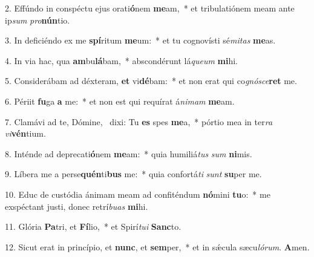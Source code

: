 2. Effúndo in conspéctu ejus orati\textbf{ó}nem \textbf{me}am,~* et tribulatiónem meam ante ip\textit{sum} \textit{pro}\textbf{nún}tio.

3. In deficiéndo ex me \textbf{spí}ritum \textbf{me}um:~* et tu cognovísti sé\textit{mi}\textit{tas} \textbf{me}as.

4. In via hac, qua \textbf{am}bu\textbf{lá}bam,~* abscondérunt lá\textit{que}\textit{um} \textbf{mi}hi.

5. Considerábam ad déxteram, \textbf{et} vi\textbf{dé}bam:~* et non erat qui co\textit{gnó}\textit{sce}\textbf{ret} me.

6. Périit \textbf{fu}ga \textbf{a} me:~* et non est qui requírat á\textit{ni}\textit{mam} \textbf{me}am.

7. Clamávi ad te, Dómine,~{\color{red}\GreDagger} dixi: Tu \textbf{es} spes \textbf{me}a,~* pórtio mea in ter\textit{ra} \textit{vi}\textbf{vén}tium.

8. Inténde ad deprecati\textbf{ó}nem \textbf{me}am:~* quia humiliá\textit{tus} \textit{sum} \textbf{ni}mis.

9. Líbera me a perse\textbf{quén}ti\textbf{bus} me:~* quia confortá\textit{ti} \textit{sunt} \textbf{su}per me.

10. Educ de custódia ánimam meam ad confiténdum \textbf{nó}mini \textbf{tu}o:~* me exspéctant justi, donec retrí\textit{bu}\textit{as} \textbf{mi}hi.

11. Glória \textbf{Pa}tri, et \textbf{Fí}lio,~* et Spirí\textit{tu}\textit{i} \textbf{Sanc}to.

12. Sicut erat in princípio, et \textbf{nunc}, et \textbf{sem}per,~* et in s\'{\ae}cula sæcu\textit{ló}\textit{rum}. \textbf{A}men.
